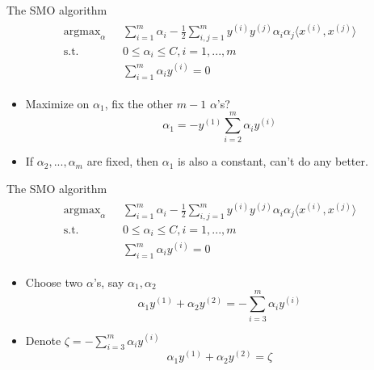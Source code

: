 \documentclass{beamer}
\begin{document}
\begin{frame}{The SMO algorithm}
\begin{align}
\begin{split}
\text{argmax}_{\alpha}\text{   }&\sum_{i=1}^m\alpha_i - \frac{1}{2}\sum_{i,j=1}^my^{(i)}y^{(j)}\alpha_i\alpha_j\langle x^{(i)}, x^{(j)}\rangle \\
\text{s.t.} \text{   }&0\leq \alpha_i \leq C, i=1,...,m\\
&\sum_{i=1}^m\alpha_iy^{(i)}=0
\end{split}
\end{align}
\begin{itemize}
\item Maximize on $\alpha_1$, fix the other $m-1$ $\alpha$'s?
\begin{equation}
\alpha_1 = -y^{(1)} \sum_{i=2}^m \alpha_iy^{(i)}
\end{equation}
\item If $\alpha_2,...,\alpha_m$ are fixed, then $\alpha_1$ is also a constant, can't do any better.
\end{itemize}
\end{frame}

\begin{frame}{The SMO algorithm}
\begin{align}
\begin{split}
\text{argmax}_{\alpha}\text{   }&\sum_{i=1}^m\alpha_i - \frac{1}{2}\sum_{i,j=1}^my^{(i)}y^{(j)}\alpha_i\alpha_j\langle x^{(i)}, x^{(j)}\rangle \\
\text{s.t.} \text{   }&0\leq \alpha_i \leq C, i=1,...,m\\
&\sum_{i=1}^m\alpha_iy^{(i)}=0
\end{split}
\end{align}
\begin{itemize}
\item Choose two $\alpha$'s, say $\alpha_1, \alpha_2$
\begin{equation}
\alpha_1y^{(1)} + \alpha_2y^{(2)} = -\sum_{i=3}^m\alpha_iy^{(i)}
\end{equation}
\item Denote $\zeta = -\sum_{i=3}^m\alpha_iy^{(i)}$
\begin{equation}
\alpha_1y^{(1)} + \alpha_2y^{(2)} = \zeta
\end{equation}
\end{itemize}
\end{frame}
\end{document}
